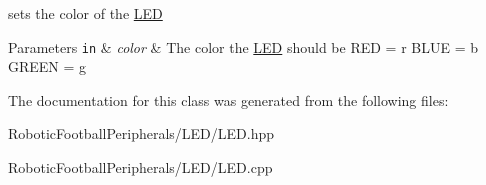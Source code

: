 sets the color of the \mbox{\hyperlink{class_l_e_d}{L\+ED}} 


\begin{DoxyParams}[1]{Parameters}
\mbox{\tt in}  & {\em color} & The color the \mbox{\hyperlink{class_l_e_d}{L\+ED}} should be R\+ED = \textquotesingle{}r\textquotesingle{} B\+L\+UE = \textquotesingle{}b\textquotesingle{} G\+R\+E\+EN = \textquotesingle{}g\textquotesingle{} \\
\hline
\end{DoxyParams}


The documentation for this class was generated from the following files\+:\begin{DoxyCompactItemize}
\item 
Robotic\+Football\+Peripherals/\+L\+E\+D/L\+E\+D.\+hpp\item 
Robotic\+Football\+Peripherals/\+L\+E\+D/L\+E\+D.\+cpp\end{DoxyCompactItemize}
